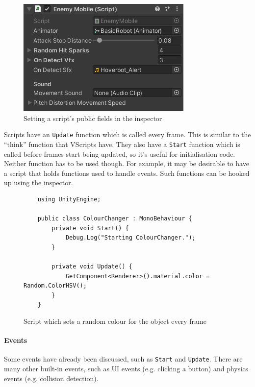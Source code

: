 \documentclass[a4paper, 12pt]{scrartcl}
\begin{document}
\begin{figure}[!ht]
  \centering
  \includegraphics[scale=0.75]{images/unity_script_inspector.png}
  \caption{Setting a script's public fields in the inspector}
  \label{fig:unity_script_inspector}
\end{figure}

Scripts have an \texttt{Update} function which is called every frame. This is similar to the ``think'' function that VScripts have. They also have a \texttt{Start} function which is called before frames start being updated, so it's useful for initialisation code. Neither function has to be used though. For example, it may be desirable to have a script that holds functions used to handle events. Such functions can be hooked up using the inspector.

\begin{figure}[!ht]
  \begin{verbatim}
    using UnityEngine;

    public class ColourChanger : MonoBehaviour {
        private void Start() {
            Debug.Log("Starting ColourChanger.");
        }

        private void Update() {
            GetComponent<Renderer>().material.color = Random.ColorHSV();
        }
    }
  \end{verbatim}
  \caption{Script which sets a random colour for the object every frame}
  \label{fig:unity_script}
\end{figure}

\paragraph{Events}
Some events have already been discussed, such as \texttt{Start} and \texttt{Update}. There are many other built-in events, such as UI events (e.g. clicking a button) and physics events (e.g. collision detection).
\end{document}
